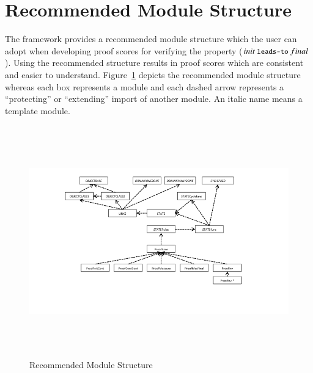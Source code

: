 \documentclass[12pt]{report}
\newcommand{\mbstt}[1]{\mbox{\small{\tt {#1}}}}
\begin{document}
\section{Recommended Module Structure}
The framework provides a recommended module structure which the user
can adopt when developing proof scores for verifying the property
($init~\mbstt{leads-to}~final$). Using the recommended structure
results in proof scores which are consistent and easier to understand.
Figure~\ref{fig:modules} depicts the recommended module structure
whereas each box represents a module and each dashed arrow represents
a ``protecting'' or ``extending'' import of another module. An italic
name means a template module.

\begin{figure}
\centering
\includegraphics[height=10cm,natwidth=720,natheight=405,clip,trim=90 80 130 20]{modules.png}
\caption{Recommended Module Structure}
\label{fig:modules}
\end{figure}
\end{document}
